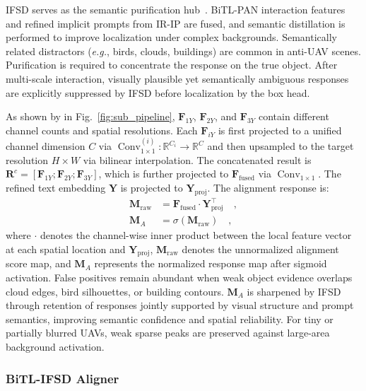 \documentclass[letterpaper, 10 pt, conference]{ieeeconf}  %
\newcommand{\mathopfont}[1]{\mathop{\mathrm{#1}}\nolimits}
\DeclareRobustCommand{\circled}[1]{\tikz[baseline=(char.base)]{\node[shape=circle,draw,inner sep=0.6pt] (char) {\footnotesize #1};}}
\begin{document}
IFSD serves as the semantic purification hub~\cite{implicitknowledge2024,li2025codet}. BiTL-PAN interaction features and refined implicit prompts from IR-IP are fused, and semantic distillation is performed to improve localization under complex backgrounds. Semantically related distractors (\textit{e.g.}, birds, clouds, buildings) are common in anti-UAV scenes. Purification is required to concentrate the response on the true object. After multi-scale interaction, visually plausible yet semantically ambiguous responses are explicitly suppressed by IFSD before localization by the box head.

As shown by \circled{C} in Fig.~\ref{fig:sub_pipeline}, $\mathbf{F}_{1Y}$, $\mathbf{F}_{2Y}$, and $\mathbf{F}_{3Y}$ contain different channel counts and spatial resolutions. Each $\mathbf{F}_{iY}$ is first projected to a unified channel dimension $C$ via $\mathopfont{Conv}_{1\times1}^{(i)}:\mathbb{R}^{C_i}\rightarrow\mathbb{R}^{C}$ and then upsampled to the target resolution $H\times W$ via bilinear interpolation. The concatenated result is $\mathbf{R}^{c}=[\mathbf{F}_{1Y};\mathbf{F}_{2Y};\mathbf{F}_{3Y}]$, which is further projected to $\mathbf{F}_{\mathrm{fused}}$ via $\mathopfont{Conv}_{1\times1}$. The refined text embedding $\mathbf{Y}$ is projected to $\mathbf{Y}_{\mathrm{proj}}$. The alignment response is:
\begin{align}
\mathbf{M}_{\mathrm{raw}} &= \mathbf{F}_{\mathrm{fused}} \cdot \mathbf{Y}_{\mathrm{proj}}^\top \quad, \\
\mathbf{M}_A &= \sigma(\mathbf{M}_{\mathrm{raw}}) \quad,
\end{align}
where $\cdot$ denotes the channel-wise inner product between the local feature vector at each spatial location and $\mathbf{Y}_{\mathrm{proj}}$, $\mathbf{M}_{\mathrm{raw}}$ denotes the unnormalized alignment score map, and $\mathbf{M}_A$ represents the normalized response map after sigmoid activation. False positives remain abundant when weak object evidence overlaps cloud edges, bird silhouettes, or building contours. $\mathbf{M}_A$ is sharpened by IFSD through retention of responses jointly supported by visual structure and prompt semantics, improving semantic confidence and spatial reliability. For tiny or partially blurred UAVs, weak sparse peaks are preserved against large-area background activation.
\subsubsection{BiTL-IFSD Aligner}
\end{document}
